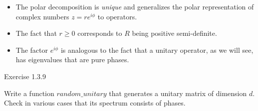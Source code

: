 \documentclass[11pt]{article}
\begin{document}
    \begin{itemize}
\item
  The polar decomposition is \emph{unique} and generalizes the polar
  representation of complex numbers \(z = r e^{i\phi}\) to operators.\\
\item
  The fact that \(r \geq 0\) corresponds to \(R\) being positive
  semi-definite.\\
\item
  The factor \(e^{i\phi}\) is analogous to the fact that a unitary
  operator, as we will see, has eigenvalues that are pure phases.
\end{itemize}

    Exercise 1.3.9

Write a function \(random\_unitary\) that generates a unitary matrix of
dimension \(d\).\\
Check in various cases that its spectrum consists of phases.
\end{document}
